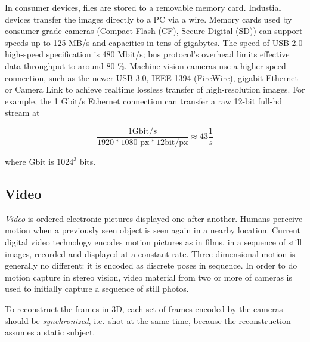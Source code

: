 
In consumer devices, files are stored to a removable memory card.
Industial devices transfer the images directly to a PC via a wire.
Memory cards used by consumer grade cameras (Compact Flash (CF), Secure Digital (SD)) can support speeds up to 125 MB/s and capacities in tens of gigabytes.
The speed of USB 2.0 high-speed specification is 480 Mbit/s; bus protocol's overhead limits effective data throughput to around 80 \%.
Machine vision cameras use a higher speed connection, such as the newer USB 3.0, IEEE 1394 (FireWire), gigabit Ethernet or Camera Link to achieve realtime lossless transfer of high-resolution images.
For example, the 1 Gbit/s Ethernet connection can transfer a raw 12-bit full-hd stream at

\begin{equation} \label{eq:gigabit-transfer}
	\frac{1 \text{Gbit}/s}{1920 * 1080 \text{ px} * 12 \text{bit}/\text{px}} \approx 43 \frac{1}{s}
\end{equation}

where Gbit is $1024^3$ bits.



\subsection{Video} \label{sec:video} %



\emph{Video} is ordered electronic pictures displayed one after another.
Humans perceive motion when a previously seen object is seen again in a nearby location.
Current digital video technology encodes motion pictures as in films, in a sequence of still images, recorded and displayed at a constant rate.
Three dimensional motion is generally no different: it is encoded as discrete poses in sequence.
In order to do motion capture in stereo vision, video material from two or more of cameras is used to initially capture a sequence of still photos.

To reconstruct the frames in 3D, each set of frames encoded by the cameras should be \emph{synchronized}, i.e.\ shot at the same time, because the reconstruction assumes a static subject.


